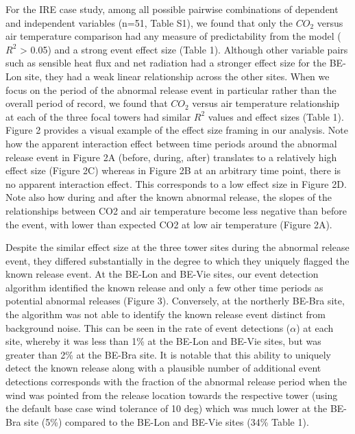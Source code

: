\documentclass{article}
\begin{document}
For the IRE case study, among all possible pairwise combinations of dependent and independent variables (n=51, Table S1), we found that only the $CO_2$ versus air temperature comparison had any measure of predictability from the model ($R^2$ > 0.05) and a strong event effect size (Table 1). Although other variable pairs such as sensible heat flux and net radiation had a stronger effect size for the BE-Lon site, they had a weak linear relationship across the other sites. When we focus on the period of the abnormal release event in particular rather than the overall period of record, we found that $CO_2$ versus air temperature relationship at each of the three focal towers had similar $R^2$ values and effect sizes (Table 1). Figure 2 provides a visual example of the effect size framing in our analysis. Note how the apparent interaction effect between time periods around the abnormal release event in Figure 2A (before, during, after) translates to a relatively high effect size (Figure 2C) whereas in Figure 2B at an arbitrary time point, there is no apparent interaction effect. This corresponds to a low effect size in Figure 2D. Note also how during and after the known abnormal release, the slopes of the relationships between CO2 and air temperature become less negative than before the event, with lower than expected CO2 at low air temperature (Figure 2A).

Despite the similar effect size at the three tower sites during the abnormal release event, they differed substantially in the degree to which they uniquely flagged the known release event. At the BE-Lon and BE-Vie sites, our event detection algorithm identified the known release and only a few other time periods as potential abnormal releases (Figure 3). Conversely, at the northerly BE-Bra site, the algorithm was not able to identify the known release event distinct from background noise. This can be seen in the rate of event detections ($\alpha$) at each site, whereby it was less than 1\% at the BE-Lon and BE-Vie sites, but was greater than 2\% at the BE-Bra site. It is notable that this ability to uniquely detect the known release along with a plausible number of additional event detections corresponds with the fraction of the abnormal release period when the wind was pointed from the release location towards the respective tower (using the default base case wind tolerance of 10 deg) which was much lower at the BE-Bra site (5\%) compared to the BE-Lon and BE-Vie sites (34\% Table 1). 
\end{document}
